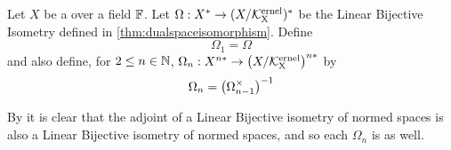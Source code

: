 \label{def:higherorderdualspaceisomorphism}
\newcommand{\NthDualSPaceIso}[1]{
    \bf \hyperref[def:higherorderdualspaceisomorphism]{$\pa{#1}^{th}$ Dual Space Isomorphism} \rm
}
\begin{df}
Let $X$ be a 
\SeminormedSpace
over a field
$\mathbb{F}$. 
Let $\Omega:X^* \to (X/\bf\mathcal{K}\rm^{ernel}_X)^*$ 
be the 
Linear 
Bijective 
Isometry
defined in 
\ref{thm:dualspaceisomorphism}.
Define 
\begin{equation*}
\Omega_1=\Omega
\end{equation*}
and also define, for $2 \leq n \in \mathbb{N}$, 
$\Omega_n:X^{n*} \to \left( X/\bf\mathcal{K}\rm^{ernel}_X\right)^{n*}$
by 
\begin{equation*}
\Omega_n=\left( \Omega_{n-1}^{\times}\right)^{-1}
\end{equation*}

By     
\label{prop:adjointoperator}
it is clear that the 
adjoint of a Linear Bijective isometry of normed spaces
is also a Linear Bijective isometry of normed spaces, and
so each $\Omega_n$ is as well. 

\end{df}
